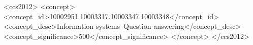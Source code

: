 \documentclass[sigconf]{acmart}
\begin{document}
\vspace{-4mm}
\begin{CCSXML}
<ccs2012>
   <concept>
       <concept_id>10002951.10003317.10003347.10003348</concept_id>
       <concept_desc>Information systems~Question answering</concept_desc>
       <concept_significance>500</concept_significance>
       </concept>
 </ccs2012>
\end{CCSXML}


\maketitle















\end{document}
